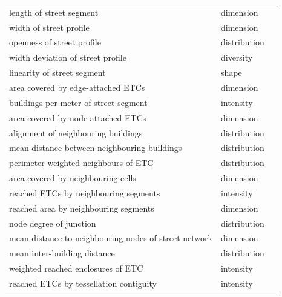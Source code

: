 \documentclass[fleqn,10pt]{wlscirep}
\begin{document}
\begin{longtable}{lll}
                                length of street segment &    dimension &          \cite{gil2012} \\
                                width of street profile &    dimension &       \cite{araldi2019} \\
                            openness of street profile & distribution &       \cite{araldi2019} \\
                        width deviation of street profile &    diversity &       \cite{araldi2019} \\
                            linearity of street segment &        shape &       \cite{araldi2019} \\
                    area covered by edge-attached ETCs &    dimension &  \cite{fleischmann2021} \\
                    buildings per meter of street segment &    intensity &  \cite{fleischmann2021} \\
                    area covered by node-attached ETCs &    dimension &  \cite{fleischmann2021} \\
                    alignment of neighbouring buildings & distribution &       \cite{hijazi2016} \\
            mean distance between neighbouring buildings & distribution &       \cite{hijazi2016} \\
                    perimeter-weighted neighbours of ETC & distribution &  \cite{fleischmann2021} \\
                    area covered by neighbouring cells &    dimension &  \cite{fleischmann2021} \\
                    reached ETCs by neighbouring segments &    intensity &  \cite{fleischmann2021} \\
                    reached area by neighbouring segments &    dimension &  \cite{fleischmann2021} \\
                                node degree of junction & distribution &       \cite{boeing2018} \\
    mean distance to neighbouring nodes of street network &    dimension &  \cite{fleischmann2021} \\
                            mean inter-building distance & distribution &       \cite{caruso2017} \\
                    weighted reached enclosures of ETC &    intensity &  \cite{fleischmann2021} \\
                reached ETCs by tessellation contiguity &    intensity &  \cite{fleischmann2021} \\

\end{longtable}
\end{document}
